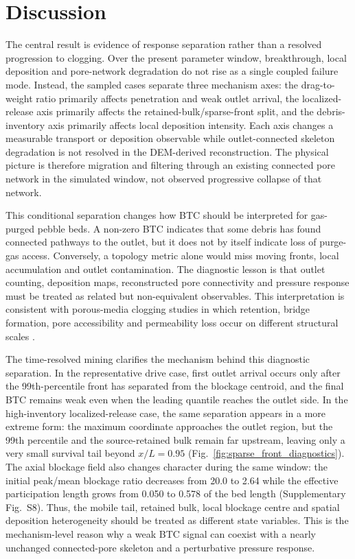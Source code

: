 \documentclass[preprint,12pt,authoryear]{elsarticle}
\newcommand{\BTC}{BTC\xspace}
\begin{document}
\section{Discussion}

The central result is evidence of response separation rather than a resolved progression to clogging. Over the present parameter window, breakthrough, local deposition and pore-network degradation do not rise as a single coupled failure mode. Instead, the sampled cases separate three mechanism axes: the drag-to-weight ratio primarily affects penetration and weak outlet arrival, the localized-release axis primarily affects the retained-bulk/sparse-front split, and the debris-inventory axis primarily affects local deposition intensity. Each axis changes a measurable transport or deposition observable while outlet-connected skeleton degradation is not resolved in the DEM-derived reconstruction. The physical picture is therefore migration and filtering through an existing connected pore network in the simulated window, not observed progressive collapse of that network.

This conditional separation changes how \BTC should be interpreted for gas-purged pebble beds. A non-zero \BTC indicates that some debris has found connected pathways to the outlet, but it does not by itself indicate loss of purge-gas access. Conversely, a topology metric alone would miss moving fronts, local accumulation and outlet contamination. The diagnostic lesson is that outlet counting, deposition maps, reconstructed pore connectivity and pressure response must be treated as related but non-equivalent observables. This interpretation is consistent with porous-media clogging studies in which retention, bridge formation, pore accessibility and permeability loss occur on different structural scales \citep{Mays2005Clogging,Dressaire2017Clogging,Parvan2020Clogging}.

The time-resolved mining clarifies the mechanism behind this diagnostic separation. In the representative drive case, first outlet arrival occurs only after the 99th-percentile front has separated from the blockage centroid, and the final \BTC remains weak even when the leading quantile reaches the outlet side. In the high-inventory localized-release case, the same separation appears in a more extreme form: the maximum coordinate approaches the outlet region, but the 99th percentile and the source-retained bulk remain far upstream, leaving only a very small survival tail beyond $x/L=0.95$ (Fig.~\ref{fig:sparse_front_diagnostics}). The axial blockage field also changes character during the same window: the initial peak/mean blockage ratio decreases from 20.0 to 2.64 while the effective participation length grows from 0.050 to 0.578 of the bed length (Supplementary Fig.~S8). Thus, the mobile tail, retained bulk, local blockage centre and spatial deposition heterogeneity should be treated as different state variables. This is the mechanism-level reason why a weak \BTC signal can coexist with a nearly unchanged connected-pore skeleton and a perturbative pressure response.
\end{document}
